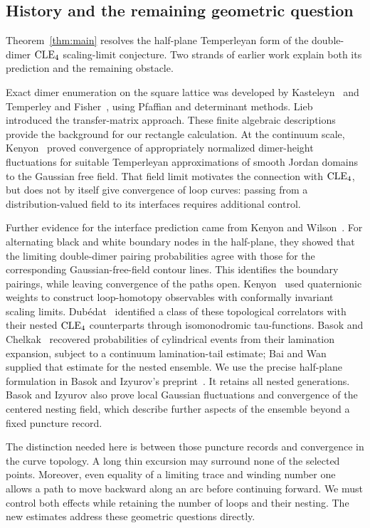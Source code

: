 \subsection{History and the remaining geometric question}
Theorem~\ref{thm:main} resolves the half-plane Temperleyan form of the
double-dimer \(\mathrm{CLE}_4\) scaling-limit conjecture. Two strands of earlier
work explain both its prediction and the remaining obstacle.

Exact dimer enumeration on the square lattice was developed by
Kasteleyn~\cite{Kasteleyn} and Temperley and Fisher~\cite{TemperleyFisher},
using Pfaffian and determinant methods. Lieb~\cite{Lieb} introduced the
transfer-matrix approach. These finite algebraic descriptions provide
the background for our rectangle calculation. At the continuum scale,
Kenyon~\cite{KenyonGFF} proved convergence of appropriately normalized
dimer-height fluctuations for suitable Temperleyan approximations of
smooth Jordan domains to the Gaussian free
field. That field limit motivates the connection with \(\mathrm{CLE}_4\), but
does not by itself give convergence of loop curves: passing from a
distribution-valued field to its interfaces requires additional control.

Further evidence for the interface prediction came from Kenyon and
Wilson~\cite{KW}. For alternating black and white
boundary nodes in the half-plane, they showed that the limiting
double-dimer pairing probabilities agree with those for the corresponding
Gaussian-free-field contour lines. This identifies the
boundary pairings, while leaving convergence of the paths open.
Kenyon~\cite{Kenyon} used quaternionic weights to construct loop-homotopy
observables with conformally invariant scaling limits. Dub\'edat~\cite{Dubedat} identified
a class of these topological correlators with their nested \(\mathrm{CLE}_4\)
counterparts through isomonodromic tau-functions.
Basok and Chelkak~\cite[Corollary~1.7]{BC} recovered probabilities of cylindrical events
from their lamination expansion, subject to a continuum lamination-tail
estimate; Bai and Wan~\cite[Corollary~1.5]{BW} supplied that estimate
for the nested ensemble.
We use the precise half-plane formulation in Basok and Izyurov's
preprint~\cite[Theorem~4.2(2), Eq.~(4.17)]{BI}.
It retains all nested generations. Basok and Izyurov also prove local
Gaussian fluctuations and convergence of the centered nesting field,
which describe further aspects of the ensemble beyond a fixed puncture
record.

The distinction needed here is between those puncture records and
convergence in the curve topology. A long thin excursion may surround
none of the selected points. Moreover, even equality of a limiting trace
and winding number one allows a path to move backward along an arc before
continuing forward. We must control both effects while retaining the
number of loops and their nesting. The new estimates address these
geometric questions directly.

